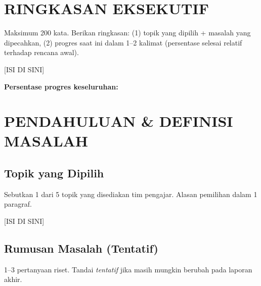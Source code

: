 \documentclass[11pt,a4paper,oneside]{report}
\begin{document}
\tableofcontents

\chapter*{RINGKASAN EKSEKUTIF}

\begin{petunjuk}
Maksimum 200 kata. Berikan ringkasan: (1) topik yang dipilih + masalah yang dipecahkan, (2) progres saat ini dalam 1--2 kalimat (persentase selesai relatif terhadap rencana awal).
\end{petunjuk}

[ISI DI SINI]

\vspace{0.5em}
\noindent\textbf{Persentase progres keseluruhan:} \fbox{[XX]\%}

\chapter{PENDAHULUAN \& DEFINISI MASALAH}
\label{bab:pendahuluan}

\section{Topik yang Dipilih}
\begin{petunjuk}
Sebutkan 1 dari 5 topik yang disediakan tim pengajar. Alasan pemilihan dalam 1 paragraf.
\end{petunjuk}

[ISI DI SINI]

\section{Rumusan Masalah (Tentatif)}
\begin{petunjuk}
1--3 pertanyaan riset. Tandai \textit{tentatif} jika masih mungkin berubah pada laporan akhir.
\end{petunjuk}
\end{document}
